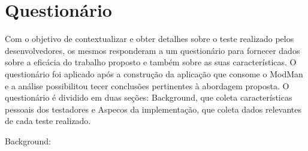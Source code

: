 \section{Questionário}\label{questionario}


Com o objetivo de contextualizar e obter detalhes sobre o teste realizado pelos desenvolvedores, os mesmos responderam a um questionário para fornecer dados sobre a eficácia do trabalho proposto e também sobre as suas características. O questionário foi aplicado após a construção da aplicação que consome o ModMan e a análise possibilitou tecer conclusões pertinentes à abordagem proposta. O questionário é dividido em duas seções: Background, que coleta características pessoais dos testadores e Aspecos da implementação, que coleta dados relevantes de cada teste realizado.

Background:

